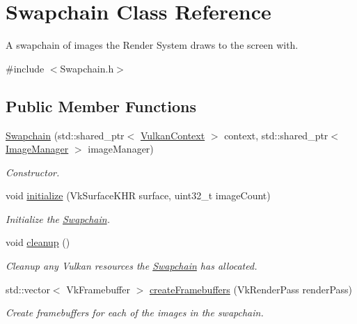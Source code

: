 \hypertarget{class_swapchain}{}\section{Swapchain Class Reference}
\label{class_swapchain}


A swapchain of images the Render System draws to the screen with.  




{\ttfamily \#include $<$Swapchain.\+h$>$}

\subsection*{Public Member Functions}
\begin{DoxyCompactItemize}
\item 
\mbox{\hyperlink{class_swapchain_aa065edb67794f690216311dff191d030}{Swapchain}} (std\+::shared\+\_\+ptr$<$ \mbox{\hyperlink{class_vulkan_context}{Vulkan\+Context}} $>$ context, std\+::shared\+\_\+ptr$<$ \mbox{\hyperlink{class_image_manager}{Image\+Manager}} $>$ image\+Manager)
\begin{DoxyCompactList}\small\item\em Constructor. \end{DoxyCompactList}\item 
void \mbox{\hyperlink{class_swapchain_aa55768e0a9950d268518cfbd0f531d6c}{initialize}} (Vk\+Surface\+K\+HR surface, uint32\+\_\+t image\+Count)
\begin{DoxyCompactList}\small\item\em Initialize the \mbox{\hyperlink{class_swapchain}{Swapchain}}. \end{DoxyCompactList}\item 
\mbox{\label{class_swapchain_a499790fed4913b2ac2a6782d4fe76633}} 
void \mbox{\hyperlink{class_swapchain_a499790fed4913b2ac2a6782d4fe76633}{cleanup}} ()
\begin{DoxyCompactList}\small\item\em Cleanup any Vulkan resources the \mbox{\hyperlink{class_swapchain}{Swapchain}} has allocated. \end{DoxyCompactList}\item 
std\+::vector$<$ Vk\+Framebuffer $>$ \mbox{\hyperlink{class_swapchain_ade933007b10309e978180d91fdfc129b}{create\+Framebuffers}} (Vk\+Render\+Pass render\+Pass)
\begin{DoxyCompactList}\small\item\em Create framebuffers for each of the images in the swapchain. \end{DoxyCompactList}\item 

\end{DoxyCompactItemize}
